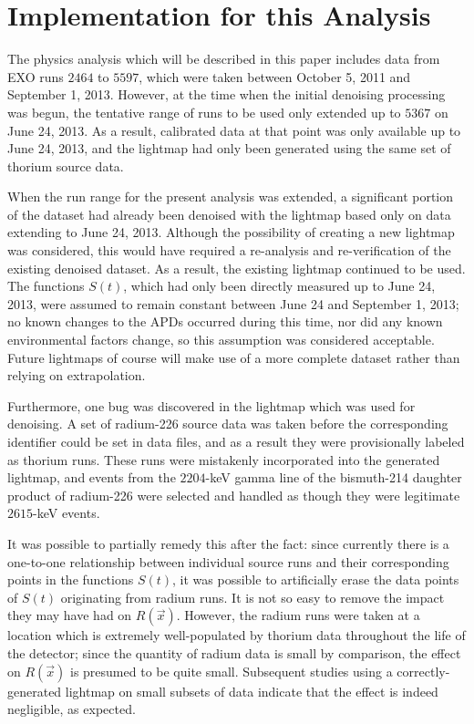 \section{Implementation for this Analysis}\label{sec:LightmapImplementationDetails}

The physics analysis which will be described in this paper includes data from EXO runs $2464$ to $5597$, which were taken between October 5, 2011 and September 1, 2013.  However, at the time when the initial denoising processing was begun, the tentative range of runs to be used only extended up to $5367$ on June 24, 2013.  As a result, calibrated data at that point was only available up to June 24, 2013, and the lightmap had only been generated using the same set of thorium source data.

When the run range for the present analysis was extended, a significant portion of the dataset had already been denoised with the lightmap based only on data extending to June 24, 2013.  Although the possibility of creating a new lightmap was considered, this would have required a re-analysis and re-verification of the existing denoised dataset.  As a result, the existing lightmap continued to be used.  The functions $S(t)$, which had only been directly measured up to June 24, 2013, were assumed to remain constant between June 24 and September 1, 2013; no known changes to the APDs occurred during this time, nor did any known environmental factors change, so this assumption was considered acceptable.  Future lightmaps of course will make use of a more complete dataset rather than relying on extrapolation.

Furthermore, one bug was discovered in the lightmap which was used for denoising.  A set of radium-226 source data was taken before the corresponding identifier could be set in data files, and as a result they were provisionally labeled as thorium runs.  These runs were mistakenly incorporated into the generated lightmap, and events from the $2204$-keV gamma line of the bismuth-214 daughter product of radium-226 were selected and handled as though they were legitimate $2615$-keV events.

It was possible to partially remedy this after the fact: since currently there is a one-to-one relationship between individual source runs and their corresponding points in the functions $S(t)$, it was possible to artificially erase the data points of $S(t)$ originating from radium runs.  It is not so easy to remove the impact they may have had on $R(\vec{x})$.  However, the radium runs were taken at a location which is extremely well-populated by thorium data throughout the life of the detector; since the quantity of radium data is small by comparison, the effect on $R(\vec{x})$ is presumed to be quite small.  Subsequent studies using a correctly-generated lightmap on small subsets of data indicate that the effect is indeed negligible, as expected.

